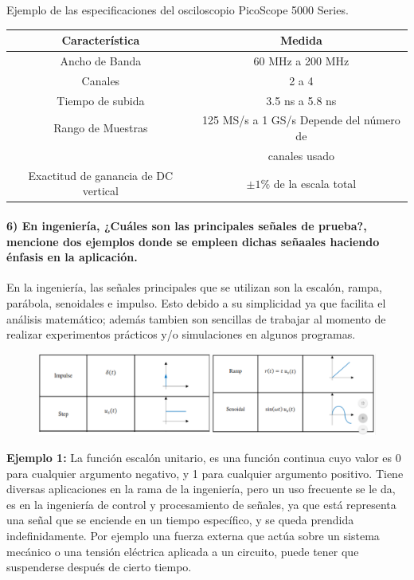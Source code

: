 \documentclass[10pt]{article}
\begin{document}
Ejemplo de las especificaciones del osciloscopio PicoScope 5000 Series.
\newline
\newline
\begin{center}
	\begin{table}[htbp]
		\centering
		\begin{tabular}{|c|c|}
			\hline
			\textbf{Característica} & 					\textbf{Medida}\\	\hline
			Ancho de Banda & 60 MHz a 200 MHz \\ \hline
			Canales & 2 a 4 \\ \hline
			Tiempo de subida & 3.5 ns a 5.8 ns \\ \hline
			Rango de Muestras & 125 MS/s a 1 GS/s Depende del número de \\ & canales usado \\ \hline
			Exactitud de ganancia de DC vertical & $\pm 1\%$ de la escala total \\ \hline
		\end{tabular}
		\newline 
	\end{table}
\end{center}

\paragraph{6) En ingeniería, ¿Cuáles son las principales señales de prueba?,\\ mencione dos ejemplos donde se empleen dichas señaales haciendo énfasis en la aplicación.} 

En la ingeniería, las señales principales que se utilizan son la escalón, rampa, parábola, senoidales e impulso. Esto debido a su simplicidad ya que facilita el análisis matemático; además tambien son sencillas de trabajar al momento de realizar experimentos prácticos y/o simulaciones en algunos programas.

\begin{figure}[h]
	\includegraphics[scale=0.33]{sen}
	\centering
\end{figure}

\textbf{Ejemplo 1:}
La función escalón unitario, es una función continua cuyo valor es 0 para cualquier argumento negativo, y 1 para cualquier argumento positivo. Tiene diversas aplicaciones en la rama de la ingeniería, pero un uso frecuente se le da, es en la ingeniería de control y procesamiento de señales, ya que está representa una señal que se enciende en un tiempo específico, y se queda prendida indefinidamente. Por ejemplo una fuerza externa que actúa sobre un sistema mecánico o una tensión eléctrica aplicada a un circuito, puede tener que suspenderse después de cierto tiempo. \\
\end{document}
